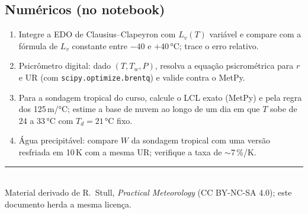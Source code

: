 \documentclass[11pt]{article}
\begin{document}
\subsection*{Numéricos (no notebook)}

\begin{enumerate}[label=\textbf{N\arabic*.},itemsep=4pt]
  \item Integre a EDO de Clausius--Clapeyron com $L_v(T)$ variável e
        compare com a fórmula de $L_v$ constante entre $-40$ e $+40\,°$C;
        trace o erro relativo.
  \item Psicrômetro digital: dado $(T, T_w, P)$, resolva a equação
        psicrométrica para $r$ e UR (com \texttt{scipy.optimize.brentq}) e
        valide contra o MetPy.
  \item Para a sondagem tropical do curso, calcule o LCL exato (MetPy) e
        pela regra dos 125\,m/°C; estime a base de nuvem ao longo de um dia
        em que $T$ sobe de 24 a 33\,°C com $T_d = 21\,°$C fixo.
  \item Água precipitável: compare $W$ da sondagem tropical com uma versão
        resfriada em 10\,K com a mesma UR; verifique a taxa de
        $\sim$7\,\%/K.
\end{enumerate}

\vspace{1em}
\noindent\rule{\linewidth}{0.4pt}\\
{\scriptsize Material derivado de R.~Stull, \emph{Practical Meteorology}
(CC BY-NC-SA 4.0); este documento herda a mesma licença.}
\end{document}
